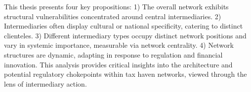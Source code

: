\documentclass[12pt, a4paper]{report}
\begin{document}
   This thesis presents four key propositions: 1) The overall network exhibits structural vulnerabilities concentrated around central intermediaries. 2) Intermediaries often display cultural or national specificity, catering to distinct clienteles. 3) Different intermediary types occupy distinct network positions and vary in systemic importance, measurable via network centrality. 4) Network structures are dynamic, adapting in response to regulation and financial innovation. This analysis provides critical insights into the architecture and potential regulatory chokepoints within tax haven networks, viewed through the lens of intermediary action. 

\pagestyle{fancy} %








\appendix



\printbibliography
\end{document}

